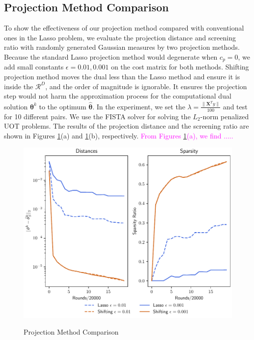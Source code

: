 \documentclass[twoside]{article}
\theoremstyle{plain}
\renewcommand{\vec}[1]{\bm{#1}}
\newcommand{\note}[1]{\textcolor{magenta}{#1}}
\begin{document}
\subsection{Projection Method Comparison}
To show the effectiveness of our projection method compared with conventional ones in the Lasso problem, we evaluate the projection distance and screening ratio with randomly generated Gaussian measures by two projection methods. Because the standard Lasso projection method would degenerate when $c_p=0$, we add small constants $\epsilon=0.01,0.001$ on the cost matrix for both methods. Shifting projection method moves the dual less than the Lasso method and ensure it is inside the $\mathcal{R}^{D}$, and the order of magnitude is ignorable. It ensures the projection step would not harm the approximation process for the computational dual solution $\vec{\theta}^{k}$ to the optimum $\vec{\hat {\theta}}$. In the experiment, we set the $\lambda = \frac{\|\mathbf{X}^Ty\|}{100}$ and test for 10 different pairs. We use the FISTA solver for solving the $L_2$-norm penalized UOT problems. The results of the projection distance and the screening ratio are shown in Figures \ref{Fig:Projection_Method_Comp}(a) and \ref{Fig:Projection_Method_Comp}(b), respectively. \note{From Figures \ref{Fig:Projection_Method_Comp}(a), we find .....}
\begin{figure}[h]
\begin{center}
\label{Fig:ex1}
\includegraphics[width = \linewidth]{pic/ex_1}
\caption{Projection Method Comparison}
\label{Fig:Projection_Method_Comp}
\end{center}
\end{figure}
\end{document}
